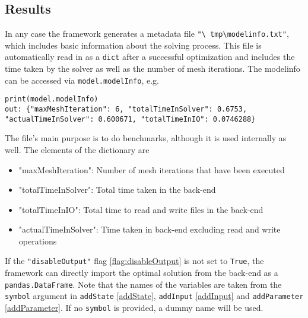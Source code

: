 \documentclass[12pt]{article}
\begin{document}
\subsection{Results}
\label{c:Results}
In any case the framework generates a metadata file \texttt{"\textbackslash
	tmp\textbackslash modelinfo.txt"}, which includes basic information about the
solving process. This file is automatically read in as a \texttt{dict} after a
successful optimization and includes the time taken by the solver as well as
the number of mesh iterations. The modelinfo can be accessed via
\texttt{model.modelInfo}, e.g.
\begin{lstlisting}
print(model.modelInfo)
out: {"maxMeshIteration": 6, "totalTimeInSolver": 0.6753, "actualTimeInSolver": 0.600671, "totalTimeInIO": 0.0746288}
\end{lstlisting}
The file's main purpose is to do benchmarks, although it is used internally as
well. The elements of the dictionary are
\begin{itemize}
	\item "maxMeshIteration": Number of mesh iterations that have been executed
	\item "totalTimeInSolver": Total time taken in the back-end
	\item "totalTimeInIO": Total time to read and write files in the back-end
	\item "actualTimeInSolver": Time taken in back-end excluding read and write
	      operations
\end{itemize}

If the \texttt{"disableOutput"} flag \eqref{flag:disableOutput} is not set to \texttt{True}, the framework
can directly import the optimal solution from the back-end as a
\texttt{pandas.DataFrame}. Note that the names of the variables are taken from
the \texttt{symbol} argument in \texttt{addState} \eqref{addState},
\texttt{addInput} \eqref{addInput} and	\texttt{addParameter}
\eqref{addParameter}. If no \texttt{symbol} is provided, a dummy name will be
used.
\end{document}
